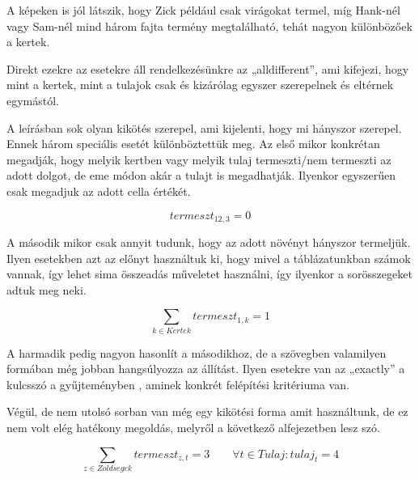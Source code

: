 \documentclass[12pt,a4paper,twoside, openright]{report}
\begin{document}

    A képeken is jól látszik, hogy Zick például csak virágokat termel, míg Hank-nél vagy 
    Sam-nél mind három fajta termény megtalálható, tehát nagyon különbözőek a kertek.

    Direkt ezekre az esetekre áll rendelkezésünkre az „alldifferent”, ami kifejezi, hogy mint a kertek, mint a tulajok csak és kizárólag egyszer szerepelnek és eltérnek egymástól.


    A leírásban sok olyan kikötés szerepel, ami kijelenti, hogy mi hányszor szerepel.
    Ennek három speciális esetét különböztettük meg.
    Az első mikor konkrétan megadják, hogy melyik kertben vagy melyik tulaj termeszti/nem termeszti az adott dolgot, de eme módon akár a tulajt is megadhatják.
    Ilyenkor egyszerűen csak megadjuk az adott cella értékét.

    \begin{equation}
    termeszt_{12,3}=0 
    \end{equation}

    A második mikor csak annyit tudunk, hogy az adott növényt hányszor termeljük.
    Ilyen esetekben azt az előnyt használtuk ki, hogy mivel a táblázatunkban számok vannak, így lehet sima összeadás műveletet használni, így ilyenkor a sorösszegeket adtuk meg neki.
    
	\begin{equation}
    \sum_{k\in Kertek} termeszt_{1,k} =1 
    \end{equation}

    A harmadik pedig nagyon hasonlít a másodikhoz, de a szövegben valamilyen formában még jobban hangsúlyozza az állítást.
    Ilyen esetekre van az „exactly” a kulcsszó a gyűjteményben , aminek konkrét felépítési kritériuma van.


    Végül, de nem utolsó sorban van még egy kikötési forma amit használtunk, de ez nem volt elég hatékony megoldás, melyről a következő alfejezetben lesz szó.

    \begin{equation}
        \sum_{z\in Zoldsegek} termeszt_{z,t} = 3 \qquad \forall t\in Tulaj: tulaj_{t} = 4
    \end{equation}
    
\end{document}

